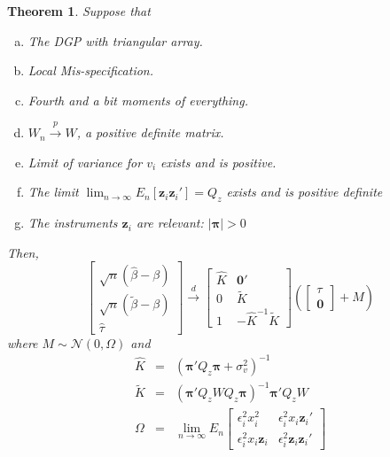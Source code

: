 \documentclass[12pt]{article}
\newtheorem{thm}{Theorem}[section]
\theoremstyle{definition}
\begin{document}
\begin{thm}
\label{thm:OLSIV}
Suppose that
  \begin{enumerate}[(a)]
    \item The DGP with triangular array.
    \item Local Mis-specification.
    \item Fourth and a bit moments of everything.
    \item $W_n \overset{p}{\rightarrow} W$, a positive definite matrix.
    \item Limit of variance for $v_i$ exists and is positive.
    \item The limit $\lim_{n\rightarrow \infty} E_n[\mathbf{z}_i \mathbf{z}_i'] = Q_z$ exists and is positive definite
    \item The instruments $\mathbf{z}_i$ are relevant:  $|\boldsymbol{\pi}|>0$
  \end{enumerate}
  Then,
  $$
\left[
\begin{array}{c}
  \sqrt{n}\left(\widehat{\beta} - \beta\right) \\
  \sqrt{n}\left(\widetilde{\beta} - \beta\right)\\
  \widehat{\tau}
\end{array}
\right] \overset{d}{\rightarrow} 
\left[\begin{array}{cc}
\widehat{K} & \mathbf{0}'\\
  0 & \widetilde{K}\\
  1 & -\widehat{K}^{-1} \widetilde{K}
  \end{array}
  \right]\left( \left[\begin{array}{c} \tau \\ \mathbf{0}  \end{array} \right] + M\right)
$$
where $M \sim \mathcal{N}(0, \Omega)$ and
  \begin{eqnarray}
 \widehat{K}&=&   \left(\boldsymbol{\pi}'Q_z \boldsymbol{\pi} + \sigma_v^2\right)^{-1}\\
    \widetilde{K}&=& \left(\boldsymbol{\pi}'Q_z W Q_z \boldsymbol{\pi} \right)^{-1}\boldsymbol{\pi}'Q_z W\\
    \Omega &=& \lim_{n\rightarrow \infty} E_n \left[
    \begin{array}{cc}
      \epsilon_i^2 x_i^2 & \epsilon_i^2 x_i \mathbf{z}_i' \\
      \epsilon_i^2 x_i \mathbf{z}_i& \epsilon_i^2 \mathbf{z}_i \mathbf{z}_i'
    \end{array}
    \right]
  \end{eqnarray}
\end{thm}
\end{document}
